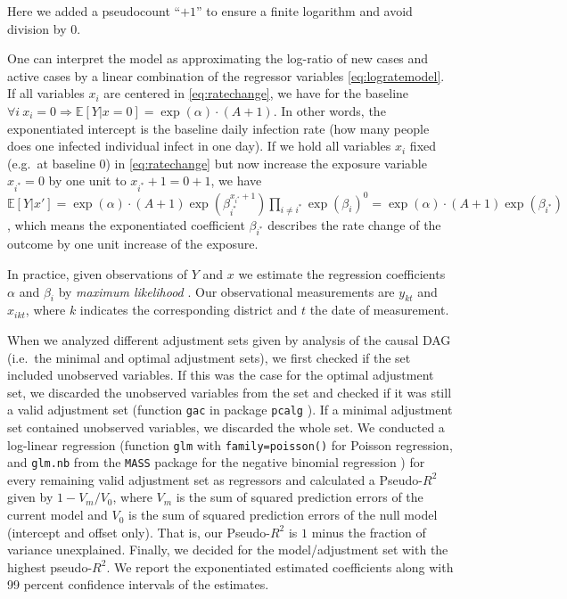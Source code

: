 \documentclass[]{elsarticle} %
\begin{document}
Here we added a pseudocount ``\(+1\)'' to ensure a finite logarithm and
avoid division by \(0\).

One can interpret the model as approximating the log-ratio of new cases
and active cases by a linear combination of the regressor variables
\eqref{eq:logratemodel}. If all variables \(x_i\) are centered in
\eqref{eq:ratechange}, we have for the baseline
\(\forall i\ x_i=0 \Rightarrow \mathbb{E}[Y|x=0]=\exp(\alpha)\cdot (A+1)\).
In other words, the exponentiated intercept is the baseline daily
infection rate (how many people does one infected individual infect in
one day). If we hold all variables \(x_i\) fixed (e.g.~at baseline 0) in
\eqref{eq:ratechange} but now increase the exposure variable
\(x_{i^{\ast}}=0\) by one unit to \(x_{i^{\ast}}+1=0+1\), we have
\(\mathbb{E}[Y|x']=\exp(\alpha)\cdot(A+1)\exp(\beta_{i^{\ast}}^{x_{i^{\ast}}+1})\prod_{i\neq i^{\ast}}\exp(\beta_i)^0=\exp(\alpha)\cdot(A+1)\exp(\beta_{i^{\ast}})\),
which means the exponentiated coefficient \(\beta_{i^{\ast}}\) describes
the rate change of the outcome by one unit increase of the exposure.

In practice, given observations of \(Y\) and \(x\) we estimate the
regression coefficients \(\alpha\) and \(\beta_i\) by \emph{maximum
likelihood} \citep{maxlikelihood}. Our observational measurements are
\(y_{kt}\) and \(x_{ikt}\), where \(k\) indicates the corresponding
district and \(t\) the date of measurement.

When we analyzed different adjustment sets given by analysis of the
causal DAG (i.e.~the minimal and optimal adjustment sets), we first
checked if the set included unobserved variables. If this was the case
for the optimal adjustment set, we discarded the unobserved variables
from the set and checked if it was still a valid adjustment set
(function \texttt{gac} in package \texttt{pcalg}
\citep{perkovi2015complete}). If a minimal adjustment set contained
unobserved variables, we discarded the whole set. We conducted a
log-linear regression (function \texttt{glm} with
\texttt{family=poisson()} for Poisson regression, and \texttt{glm.nb}
from the \texttt{MASS} package for the negative binomial regression
\citep{mass}) for every remaining valid adjustment set as regressors and
calculated a Pseudo-\(R^2\) given by \(1-V_m/V_0\), where \(V_m\) is the
sum of squared prediction errors of the current model and \(V_0\) is the
sum of squared prediction errors of the null model (intercept and offset
only). That is, our Pseudo-\(R^2\) is \(1\) minus the fraction of
variance unexplained. Finally, we decided for the model/adjustment set
with the highest pseudo-\(R^2\). We report the exponentiated estimated
coefficients along with 99 percent confidence intervals of the
estimates.
\end{document}
